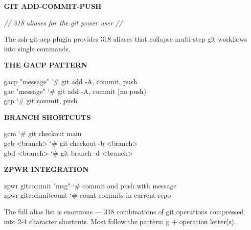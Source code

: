 \documentclass[11pt,a4paper,twoside]{book}
\begin{document}
\vspace{10pt}
{\large\bfseries\color{neoncyan} GIT ADD-COMMIT-PUSH}\vspace{6pt}

{\small\itshape\color{dimtext} // 318 aliases for the git power user //}

The zsh-git-acp plugin provides 318 aliases that collapse multi-step git workflows into single commands.


\vspace{12pt}
{\bfseries\color{neonyellow} THE GACP PATTERN}\vspace{4pt}

\begin{codebox}
\color{neongreen}gacp "message"              {\char`\#} git add -A, commit, push\\
\color{neongreen}gac "message"               {\char`\#} git add -A, commit (no push)\\
\color{neongreen}gcp                          {\char`\#} git commit, push\\
\end{codebox}


\vspace{12pt}
{\bfseries\color{neonyellow} BRANCH SHORTCUTS}\vspace{4pt}

\begin{codebox}
\color{neongreen}gcm                          {\char`\#} git checkout main\\
\color{neongreen}gcb <branch>                 {\char`\#} git checkout -b <branch>\\
\color{neongreen}gbd <branch>                 {\char`\#} git branch -d <branch>\\
\end{codebox}


\vspace{12pt}
{\bfseries\color{neonyellow} \textbf{ZPWR} INTEGRATION}\vspace{4pt}

\begin{codebox}
\color{neongreen}zpwr gitcommit "msg"        {\char`\#} commit and push with message\\
\color{neongreen}zpwr gitcommitcount          {\char`\#} count commits in current repo\\
\end{codebox}

The full alias list is enormous — 318 combinations of git operations compressed into 2-4 character shortcuts. Most follow the pattern: g + operation letter(s).
\end{document}
